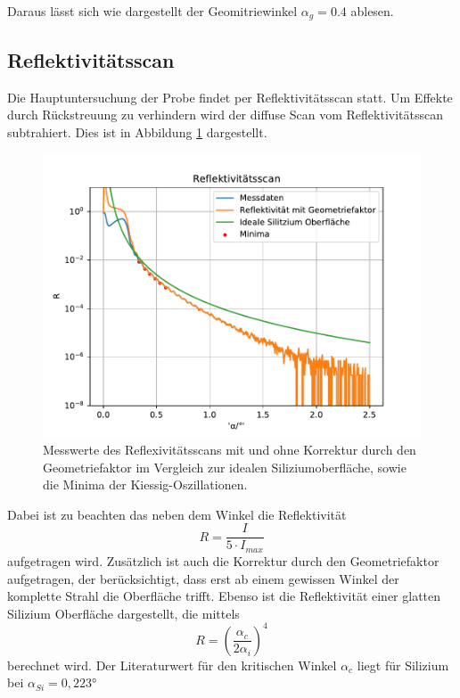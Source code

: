 Daraus lässt sich wie dargestellt der Geomitriewinkel $\alpha_g = 0.4$ ablesen.



\subsection{Reflektivitätsscan}
Die Hauptuntersuchung der Probe findet per Reflektivitätsscan statt.
Um Effekte durch Rückstreuung zu verhindern wird der diffuse Scan vom Reflektivitätsscan subtrahiert.
Dies ist in Abbildung \ref{fig:ref} dargestellt.
\begin{figure}[h]
    \centering
    \includegraphics[width = 1\textwidth]{Auswertung/Graphen/Reflektivitaetsscan.pdf}
    \caption{Messwerte des Reflexivitätsscans mit und ohne Korrektur durch den Geometriefaktor im Vergleich zur idealen Siliziumoberfläche, sowie die Minima der Kiessig-Oszillationen.}
    \label{fig:ref}
\end{figure}
Dabei ist zu beachten das neben dem Winkel die Reflektivität
\begin{equation*}
    R = \frac{I}{5\cdot I_{max}} 
\end{equation*}
aufgetragen wird.
Zusätzlich ist auch die Korrektur durch den Geometriefaktor aufgetragen,
der berücksichtigt,
dass erst ab einem gewissen Winkel der komplette Strahl die Oberfläche trifft.
Ebenso ist die Reflektivität einer glatten Silizium Oberfläche dargestellt,
die mittels
\begin{equation}
    R = \left(\frac{\alpha_c}{2\alpha_i}\right)^4
\end{equation}
berechnet wird. 
Der Literaturwert für den kritischen Winkel $\alpha_c$ liegt für Silizium bei $\alpha_{Si} = 0,223°$ \cite{wert}

